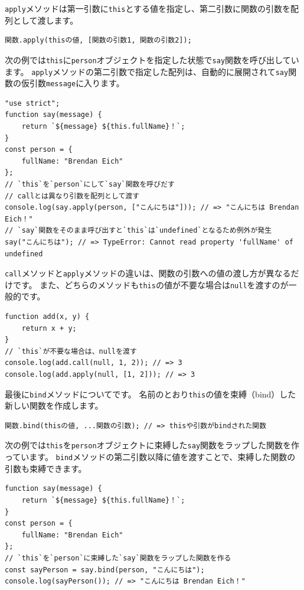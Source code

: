 \texttt{apply}メソッドは第一引数に\texttt{this}とする値を指定し、第二引数に関数の引数を配列として渡します。

\begin{lstlisting}
関数.apply(thisの値, [関数の引数1, 関数の引数2]);
\end{lstlisting}

次の例では\texttt{this}に\texttt{person}オブジェクトを指定した状態で\texttt{say}関数を呼び出しています。
\texttt{apply}メソッドの第二引数で指定した配列は、自動的に展開されて\texttt{say}関数の仮引数\texttt{message}に入ります。

\begin{lstlisting}
"use strict";
function say(message) {
    return `${message} ${this.fullName}！`;
}
const person = {
    fullName: "Brendan Eich"
};
// `this`を`person`にして`say`関数を呼びだす
// callとは異なり引数を配列として渡す
console.log(say.apply(person, ["こんにちは"])); // => "こんにちは Brendan Eich！"
// `say`関数をそのまま呼び出すと`this`は`undefined`となるため例外が発生
say("こんにちは"); // => TypeError: Cannot read property 'fullName' of undefined
\end{lstlisting}

\texttt{call}メソッドと\texttt{apply}メソッドの違いは、関数の引数への値の渡し方が異なるだけです。
また、どちらのメソッドも\texttt{this}の値が不要な場合は\texttt{null}を渡すのが一般的です。

\begin{lstlisting}
function add(x, y) {
    return x + y;
}
// `this`が不要な場合は、nullを渡す
console.log(add.call(null, 1, 2)); // => 3
console.log(add.apply(null, [1, 2])); // => 3
\end{lstlisting}

最後に\texttt{bind}メソッドについてです。
名前のとおり\texttt{this}の値を束縛（bind）した新しい関数を作成します。

\begin{lstlisting}
関数.bind(thisの値, ...関数の引数); // => thisや引数がbindされた関数
\end{lstlisting}

次の例では\texttt{this}を\texttt{person}オブジェクトに束縛した\texttt{say}関数をラップした関数を作っています。
\texttt{bind}メソッドの第二引数以降に値を渡すことで、束縛した関数の引数も束縛できます。

\begin{lstlisting}
function say(message) {
    return `${message} ${this.fullName}！`;
}
const person = {
    fullName: "Brendan Eich"
};
// `this`を`person`に束縛した`say`関数をラップした関数を作る
const sayPerson = say.bind(person, "こんにちは");
console.log(sayPerson()); // => "こんにちは Brendan Eich！"
\end{lstlisting}

